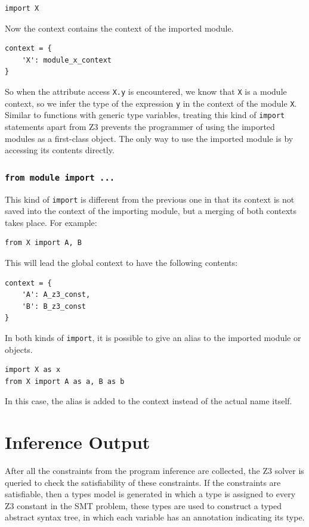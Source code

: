 \begin{lstlisting}
import X
\end{lstlisting}

Now the context contains the context of the imported module.

\begin{lstlisting}
context = {
	'X': module_x_context
}
\end{lstlisting}
So when the attribute access \lstinline|X.y| is encountered, we know that \lstinline|X| is a module context, so we infer the type of the expression \lstinline|y| in the context of the module \lstinline|X|. \\

Similar to functions with generic type variables, treating this kind of \lstinline|import| statements apart from Z3 prevents the programmer of using the imported modules as a first-class object. The only way to use the imported module is by accessing its contents directly.

\subsubsection{\lstinline|from module import ...|} 
This kind of \lstinline|import| is different from the previous one in that its context is not saved into the context of the importing module, but a merging of both contexts takes place. For example:
\begin{lstlisting}
from X import A, B
\end{lstlisting}

This will lead the global context to have the following contents:
\begin{lstlisting}
context = {
	'A': A_z3_const,
	'B': B_z3_const
}
\end{lstlisting}

In both kinds of \lstinline|import|, it is possible to give an alias to the imported module or objects.
\begin{lstlisting}
import X as x
from X import A as a, B as b
\end{lstlisting}

In this case, the alias is added to the context instead of the actual name itself.
\section{Inference Output}
After all the constraints from the program inference are collected, the Z3 solver is queried to check the satisfiability of these constraints. If the constraints are satisfiable, then a types model is generated in which a type is assigned to every Z3 constant in the SMT problem, these types are used to construct a typed abstract syntax tree, in which each variable has an annotation indicating its type.
